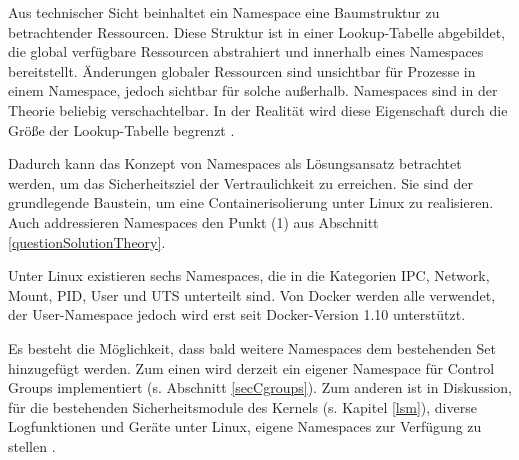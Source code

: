 \documentclass[../main.tex]{subfiles}
\begin{document}




		Aus technischer Sicht beinhaltet ein Namespace eine Baumstruktur zu betrachtender Ressourcen. Diese Struktur ist in einer Lookup-Tabelle abgebildet, die global verfügbare Ressourcen abstrahiert und innerhalb eines Namespaces bereitstellt. Änderungen globaler Ressourcen sind unsichtbar für Prozesse in einem Namespace, jedoch sichtbar für solche außerhalb. Namespaces sind in der Theorie beliebig verschachtelbar. In der Realität wird diese Eigenschaft durch die Größe der Lookup-Tabelle begrenzt \cite[S.1f.]{IBMcheckpointRestart}\cite{namespaces}.

		Dadurch kann das Konzept von Namespaces als Lösungsansatz betrachtet werden, um das Sicherheitsziel der Vertraulichkeit zu erreichen. Sie sind der grundlegende Baustein, um eine Containerisolierung unter Linux zu realisieren. Auch addressieren Namespaces den Punkt (1) aus Abschnitt \ref{questionSolutionTheory}.

		Unter Linux existieren sechs Namespaces, die in die Kategorien IPC, Network, Mount, PID, User und UTS unterteilt sind. Von Docker werden alle verwendet, der User-Namespace jedoch wird erst seit Docker-Version 1.10 unterstützt.

		Es besteht die Möglichkeit, dass bald weitere Namespaces dem bestehenden Set hinzugefügt werden. Zum einen wird derzeit ein eigener Namespace für Control Groups implementiert (s. Abschnitt \ref{secCgroups}). Zum anderen ist in Diskussion, für die bestehenden Sicherheitsmodule des Kernels (s. Kapitel \ref{lsm}), diverse Logfunktionen und Geräte unter Linux, eigene Namespaces zur Verfügung zu stellen \cite[S.19]{presContainerSec}.


\end{document}
